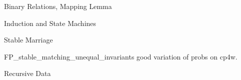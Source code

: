 \documentclass[quiz]{mcs}
\begin{document}



\iffalse
\begin{center}
{\Large DRAFT}
\end{center}
\fi

\begin{staffnotes}
\begin{center}
{\large Binary Relations, Mapping Lemma}
\end{center}
\end{staffnotes}


\begin{staffnotes}
\begin{center}
{\large Induction and State Machines}
\end{center}
\end{staffnotes}


\examspace

\begin{staffnotes}
\begin{center}
{\large Stable Marriage}
\end{center}
\end{staffnotes}




\examspace

\begin{staffnotes}
FP\_stable\_matching\_unequal\_invariants good variation of probs on cp4w.
\end{staffnotes}

\begin{staffnotes}
\begin{center}
{\large Recursive Data}
\end{center}
\end{staffnotes}
\end{document}
